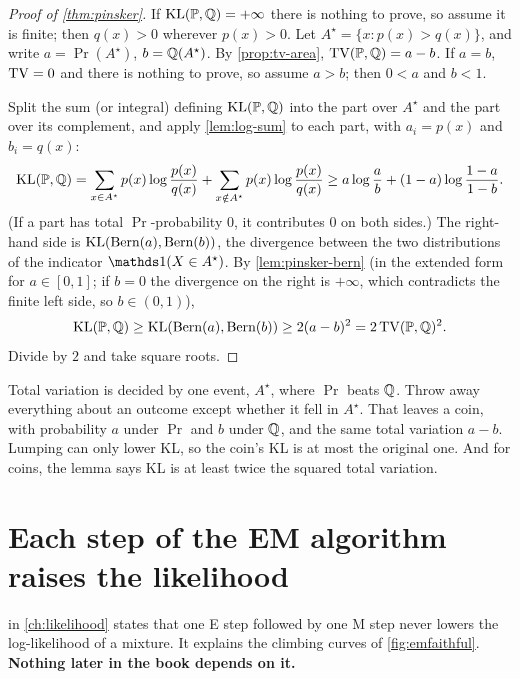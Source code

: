 \begin{proof}[Proof of \cref{thm:pinsker}]
If $\mathrm{KL}(\mathbb{P}, \mathbb{Q}) = +\infty$ there is nothing to prove, so assume it is finite; then $q(x) > 0$ wherever $p(x) > 0$.
Let $A^\star = \{x : p(x) > q(x)\}$, and write $a = \Pr(A^\star)$, $b = \mathbb{Q}(A^\star)$.
By \cref{prop:tv-area}, $\mathrm{TV}(\mathbb{P}, \mathbb{Q}) = a - b$. If $a = b$, $\mathrm{TV} = 0$ and there is nothing to prove, so assume $a > b$; then $0 < a$ and $b < 1$.

Split the sum (or integral) defining $\mathrm{KL}(\mathbb{P}, \mathbb{Q})$ into the part over $A^\star$ and the part over its complement, and apply \cref{lem:log-sum} to each part, with $a_i = p(x)$ and $b_i = q(x)$:
\[
\mathrm{KL}(\mathbb{P}, \mathbb{Q}) = \sum_{x \in A^\star} p(x)\log\frac{p(x)}{q(x)} + \sum_{x \notin A^\star} p(x)\log\frac{p(x)}{q(x)} \geq a\log\frac{a}{b} + (1 - a)\log\frac{1 - a}{1 - b}.
\]
(If a part has total $\Pr$-probability $0$, it contributes $0$ on both sides.)
The right-hand side is $\mathrm{KL}(\text{Bern}(a), \text{Bern}(b))$, the divergence between the two distributions of the indicator $\ind(X \in A^\star)$.
By \cref{lem:pinsker-bern} (in the extended form for $a \in [0, 1]$; if $b = 0$ the divergence on the right is $+\infty$, which contradicts the finite left side, so $b \in (0, 1)$),
\[
\mathrm{KL}(\mathbb{P}, \mathbb{Q}) \geq \mathrm{KL}(\text{Bern}(a), \text{Bern}(b)) \geq 2(a - b)^2 = 2\,\mathrm{TV}(\mathbb{P}, \mathbb{Q})^2.
\]
Divide by $2$ and take square roots.
\end{proof}

\begin{intuition}
Total variation is decided by one event, $A^\star$, where $\Pr$ beats $\mathbb{Q}$.
Throw away everything about an outcome except whether it fell in $A^\star$.
That leaves a coin, with probability $a$ under $\Pr$ and $b$ under $\mathbb{Q}$, and the same total variation $a - b$.
Lumping can only lower KL, so the coin's KL is at most the original one.
And for coins, the lemma says KL is at least twice the squared total variation.
\end{intuition}

\section{Each step of the EM algorithm raises the likelihood}
\label{sec:proof-em}

 in \cref{ch:likelihood} states that one E step followed by one M step never lowers the log-likelihood of a mixture.
It explains the climbing curves of \cref{fig:emfaithful}.
\textbf{Nothing later in the book depends on it.}

